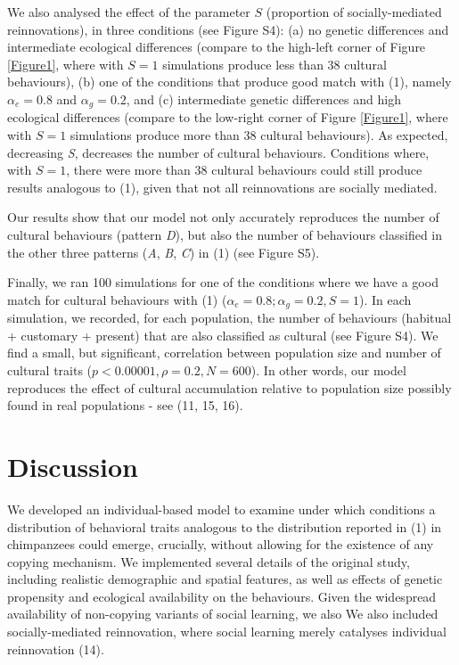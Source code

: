 \documentclass[9pt,twocolumn,twoside,]{pnas-new}
\begin{document}
We also analysed the effect of the parameter \(S\) (proportion of
socially-mediated reinnovations), in three conditions (see Figure S4):
(a) no genetic differences and intermediate ecological differences
(compare to the high-left corner of Figure \ref{Figure1}, where with
\(S=1\) simulations produce less than 38 cultural behaviours), (b) one
of the conditions that produce good match with (1), namely
\(\alpha_e=0.8\) and \(\alpha_g=0.2\), and (c) intermediate genetic
differences and high ecological differences (compare to the low-right
corner of Figure \ref{Figure1}, where with \(S=1\) simulations produce
more than 38 cultural behaviours). As expected, decreasing \emph{S},
decreases the number of cultural behaviours. Conditions where, with
\(S=1\), there were more than 38 cultural behaviours could still produce
results analogous to (1), given that not all reinnovations are socially
mediated.

Our results show that our model not only accurately reproduces the
number of cultural behaviours (pattern \emph{D}), but also the number of
behaviours classified in the other three patterns (\emph{A}, \emph{B},
\emph{C}) in (1) (see Figure S5).

Finally, we ran 100 simulations for one of the conditions where we have
a good match for cultural behaviours with (1)
(\(\alpha_e=0.8;\alpha_g=0.2, S=1\)). In each simulation, we recorded,
for each population, the number of behaviours (habitual + customary +
present) that are also classified as cultural (see Figure S4). We find a
small, but significant, correlation between population size and number
of cultural traits (\(p<0.00001,\rho=0.2,N=600\)). In other words, our
model reproduces the effect of cultural accumulation relative to
population size possibly found in real populations - see (11, 15, 16).

\section*{Discussion}\label{discussion}

We developed an individual-based model to examine under which conditions
a distribution of behavioral traits analogous to the distribution
reported in (1) in chimpanzees could emerge, crucially, without allowing
for the existence of any copying mechanism. We implemented several
details of the original study, including realistic demographic and
spatial features, as well as effects of genetic propensity and
ecological availability on the behaviours. Given the widespread
availability of non-copying variants of social learning, we also We also
included socially-mediated reinnovation, where social learning merely
catalyses individual reinnovation (14).
\end{document}
